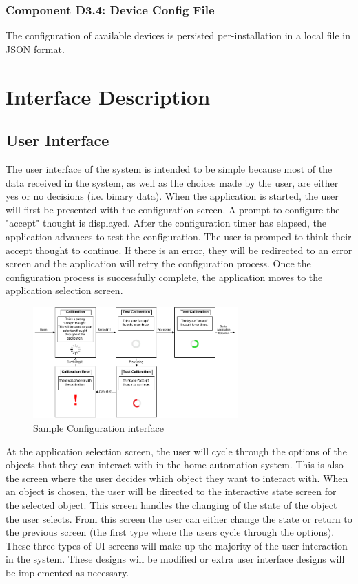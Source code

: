 \documentclass{article}
\begin{document}
\subsubsection{Component D3.4: Device Config File}
The configuration of available devices is persisted per-installation in a
local file in JSON format.

\newpage

\section{Interface Description}

\subsection{User Interface}

The user interface of the system is intended to be simple because most of
the data received in the system, as well as the choices made by the user,
are either yes or no decisions (i.e. binary data). When the application is
started, the user will first be presented with the configuration screen. A
prompt to configure the "accept" thought is displayed. After the
configuration timer has elapsed, the application advances to test the
configuration. The user is promped to think their accept thought to
continue. If there is an error, they will be redirected to an error screen
and the application will retry the configuration process. Once the
configuration process is successfully complete, the application moves to the
application selection screen. 

\begin{figure}[h!]
	
  \centering
    \includegraphics[width=0.7\textwidth]{ConfigurationUI}
   \caption{Sample Configuration interface}
   \label{fig:ui}
\end{figure}

At the application selection screen, the user will cycle through the options
of the objects that they can interact with in the home automation system.
This is also the screen where the user decides which object they want to
interact with. When an object is chosen, the user will be directed to the
interactive state screen for the selected object. This screen handles the
changing of the state of the object the user selects. From this screen the
user can either change the state or return to the previous screen (the first
type where the users cycle through the options). These three types of UI
screens will make up the majority of the user interaction in the system.
These designs will be modified or extra user interface designs will be
implemented as necessary. 
\end{document}

